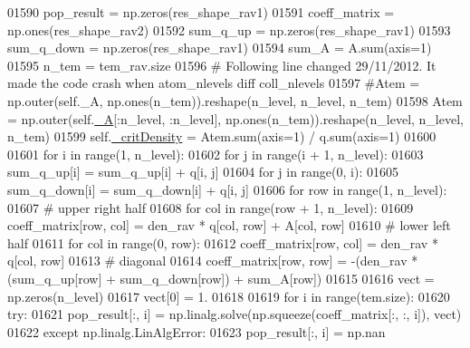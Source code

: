 \begin{DoxyCode}
{{01590             pop\_result = np.zeros(res\_shape\_rav1)
01591             coeff\_matrix = np.ones(res\_shape\_rav2)
01592             sum\_q\_up = np.zeros(res\_shape\_rav1)
01593             sum\_q\_down = np.zeros(res\_shape\_rav1)
01594             sum\_A = A.sum(axis=1)
01595             n\_tem = tem\_rav.size
01596             \textcolor{comment}{# Following line changed 29/11/2012. It made the code crash when atom\_nlevels diff coll\_nlevels}
01597             \textcolor{comment}{#Atem = np.outer(self.\_A, np.ones(n\_tem)).reshape(n\_level, n\_level, n\_tem)}
01598             Atem = np.outer(self.\hyperlink{classpyneb_1_1core_1_1pynebcore_1_1_atom_aa6416fe661b8deaa008179314727e025}{\_A}[:n\_level, :n\_level], np.ones(n\_tem)).reshape(n\_level, n\_level, n\_tem)
01599             self.\hyperlink{classpyneb_1_1core_1_1pynebcore_1_1_atom_a1d0823a36ca030fd149522fe72908631}{\_critDensity} = Atem.sum(axis=1) / q.sum(axis=1)
01600 
01601             \textcolor{keywordflow}{for} i \textcolor{keywordflow}{in} range(1, n\_level):
01602                 \textcolor{keywordflow}{for} j \textcolor{keywordflow}{in} range(i + 1, n\_level):
01603                     sum\_q\_up[i] = sum\_q\_up[i] + q[i, j]
01604                 \textcolor{keywordflow}{for} j \textcolor{keywordflow}{in} range(0, i):
01605                     sum\_q\_down[i] = sum\_q\_down[i] + q[i, j]
01606             \textcolor{keywordflow}{for} row \textcolor{keywordflow}{in} range(1, n\_level):
01607                 \textcolor{comment}{# upper right half            }
01608                 \textcolor{keywordflow}{for} col \textcolor{keywordflow}{in} range(row + 1, n\_level):
01609                     coeff\_matrix[row, col] = den\_rav * q[col, row] + A[col, row]
01610                 \textcolor{comment}{# lower left half}
01611                 \textcolor{keywordflow}{for} col \textcolor{keywordflow}{in} range(0, row):
01612                     coeff\_matrix[row, col] = den\_rav * q[col, row]
01613                 \textcolor{comment}{# diagonal}
01614                 coeff\_matrix[row, row] = -(den\_rav * (sum\_q\_up[row] + sum\_q\_down[row]) + sum\_A[row])
01615 
01616             vect = np.zeros(n\_level)
01617             vect[0] = 1.
01618             
01619             \textcolor{keywordflow}{for} i \textcolor{keywordflow}{in} range(tem.size):
01620                 \textcolor{keywordflow}{try}:
01621                     pop\_result[:, i] = np.linalg.solve(np.squeeze(coeff\_matrix[:, :, i]), vect)
01622                 \textcolor{keywordflow}{except} np.linalg.LinAlgError:
01623                     pop\_result[:, i] = np.nan
}}
\end{DoxyCode}
